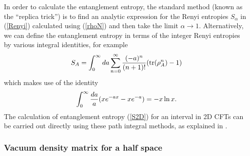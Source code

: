 \documentclass[12pt,epsf]{article}
\newcommand{\be}{\begin{equation}}
\newcommand{\ee}{\end{equation}}
\newcommand{\tr}{\operatorname{tr}}
\begin{document}
In order to calculate the entanglement entropy, the standard method (known as the ``replica trick'') is to find an analytic expression for the Renyi entropies $S_\alpha$ in (\ref{Renyi}) calculated using  (\ref{rhoN}) and then take the limit $\alpha \to 1$. Alternatively, we can define the entanglement entropy in terms of the integer Renyi entropies by various integral identities, for example
\be
S_A = \int_0^\infty da \sum_{n=0}^\infty {(-a)^n \over (n+1)!} (\tr(\rho_A^n) - 1)
\ee
which makes use of the identity
\be
\int_0^\infty {da \over a} (x e^{-a x} - x e^{-a}) = - x \ln x .
\ee
The calculation of entanglement entropy (\ref{S2D}) for an interval in 2D CFTs can be carried out directly using these path integral methods, as explained in \cite{Calabrese:2004eu}.

\subsubsection*{Vacuum density matrix for a half space}
\end{document}
